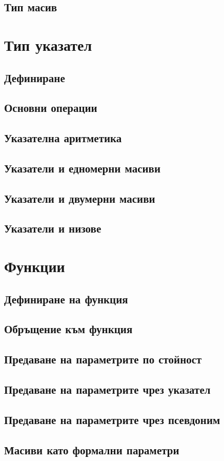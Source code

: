 \documentclass[fleqn,12pt]{article}
\begin{document}
\begin{flushleft}
\subsection{Тип масив}

\section{Тип указател}
\subsection{Дефиниране}
\subsection{Основни операции}
\subsection{Указателна аритметика}
\subsection{Указатели и едномерни масиви}
\subsection{Указатели и двумерни масиви}
\subsection{Указатели и низове}

\section{Функции}
\subsection{Дефиниране на функция}
\subsection{Обръщение към функция}
\subsection{Предаване на параметрите по стойност}
\subsection{Предаване на параметрите чрез указател}
\subsection{Предаване на параметрите чрез псевдоним}
\subsection{Масиви като формални параметри}

\end{flushleft}
\end{document}
